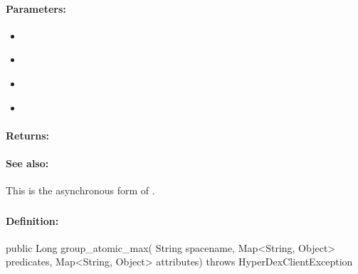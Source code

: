 \paragraph{Parameters:}
\begin{itemize}[noitemsep]
\item {}\\

\item {}\\

\item {}\\

\item {}\\

\end{itemize}

\paragraph{Returns:}


\paragraph{See also:}  This is the asynchronous form of .

\pagebreak
\subsubsection{}
\label{api:java:group_atomic_max}


\paragraph{Definition:}
\begin{javacode}
public Long group_atomic_max(
        String spacename,
        Map<String, Object> predicates,
        Map<String, Object> attributes) throws HyperDexClientException
\end{javacode}

